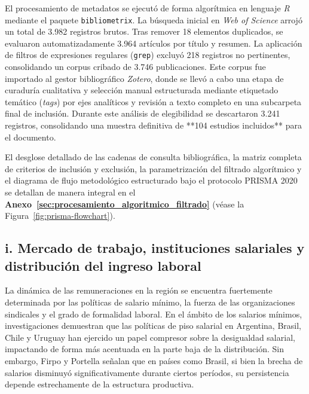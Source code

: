 El procesamiento de metadatos se ejecutó de forma algorítmica en lenguaje \textit{R} mediante el paquete \texttt{bibliometrix}. La búsqueda inicial en \textit{Web of Science} arrojó un total de 3.982 registros brutos. Tras remover 18 elementos duplicados, se evaluaron automatizadamente 3.964 artículos por título y resumen. La aplicación de filtros de expresiones regulares (\texttt{grep}) excluyó 218 registros no pertinentes, consolidando un corpus cribado de 3.746 publicaciones. Este corpus fue importado al gestor bibliográfico \textit{Zotero}, donde se llevó a cabo una etapa de curaduría cualitativa y selección manual estructurada mediante etiquetado temático (\textit{tags}) por ejes analíticos y revisión a texto completo en una subcarpeta final de inclusión. Durante este análisis de elegibilidad se descartaron 3.241 registros, consolidando una muestra definitiva de **104 estudios incluidos** para el documento.

El desglose detallado de las cadenas de consulta bibliográfica, la matriz completa de criterios de inclusión y exclusión, la parametrización del filtrado algorítmico y el diagrama de flujo metodológico estructurado bajo el protocolo PRISMA 2020 se detallan de manera integral en el \textbf{Anexo~\ref{sec:procesamiento_algoritmico_filtrado}} (véase la Figura~\ref{fig:prisma-flowchart}).

\subsection{i. Mercado de trabajo, instituciones salariales y distribución del ingreso laboral}

La dinámica de las remuneraciones en la región se encuentra fuertemente determinada por las políticas de salario mínimo, la fuerza de las organizaciones sindicales y el grado de formalidad laboral. En el ámbito de los salarios mínimos, investigaciones demuestran \parencite{MaurizioVazquez2016, GindlingRonconi2025} que las políticas de piso salarial en Argentina, Brasil, Chile y Uruguay han ejercido un papel compresor sobre la desigualdad salarial, impactando de forma más acentuada en la parte baja de la distribución. Sin embargo, Firpo y Portella \parencite*{FirpoPortella2025} señalan que en países como Brasil, si bien la brecha de salarios disminuyó significativamente durante ciertos períodos, su persistencia depende estrechamente de la estructura productiva.

